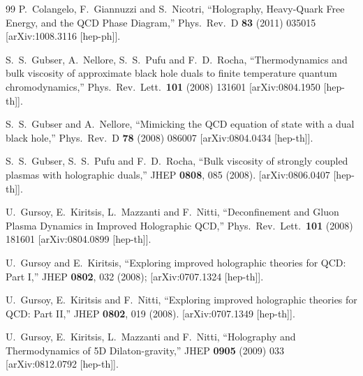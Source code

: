 \documentclass[11pt,a4paper,psfrag]{article}
\begin{document}
\begin{thebibliography}{99}
  P.~Colangelo, F.~Giannuzzi and S.~Nicotri,
  ``Holography, Heavy-Quark Free Energy, and the QCD Phase Diagram,''
  Phys.\ Rev.\ D {\bf 83} (2011) 035015
  [arXiv:1008.3116 [hep-ph]].

  S.~S.~Gubser, A.~Nellore, S.~S.~Pufu and F.~D.~Rocha,
  ``Thermodynamics and bulk viscosity of approximate black hole duals to finite temperature quantum chromodynamics,''
  Phys.\ Rev.\ Lett.\  {\bf 101} (2008) 131601
  [arXiv:0804.1950 [hep-th]].

  S.~S.~Gubser and A.~Nellore,
  ``Mimicking the QCD equation of state with a dual black hole,''
  Phys.\ Rev.\ D {\bf 78} (2008) 086007
  [arXiv:0804.0434 [hep-th]].

  S.~S.~Gubser, S.~S.~Pufu and F.~D.~Rocha,
  ``Bulk viscosity of strongly coupled plasmas with holographic duals,''
  JHEP {\bf 0808}, 085 (2008).
  [arXiv:0806.0407 [hep-th]].

  U.~Gursoy, E.~Kiritsis, L.~Mazzanti and F.~Nitti,
  ``Deconfinement and Gluon Plasma Dynamics in Improved Holographic QCD,''
  Phys.\ Rev.\ Lett.\  {\bf 101} (2008) 181601
  [arXiv:0804.0899 [hep-th]].

  U.~Gursoy and E.~Kiritsis,
  ``Exploring improved holographic theories for QCD: Part I,''
  JHEP {\bf 0802}, 032 (2008);
  [arXiv:0707.1324 [hep-th]].

  U.~Gursoy, E.~Kiritsis and F.~Nitti,
  ``Exploring improved holographic theories for QCD: Part II,''
  JHEP {\bf 0802}, 019 (2008).
  [arXiv:0707.1349 [hep-th]].

  U.~Gursoy, E.~Kiritsis, L.~Mazzanti and F.~Nitti,
  ``Holography and Thermodynamics of 5D Dilaton-gravity,''
  JHEP {\bf 0905} (2009) 033
  [arXiv:0812.0792 [hep-th]].


\end{thebibliography}
\end{document}
